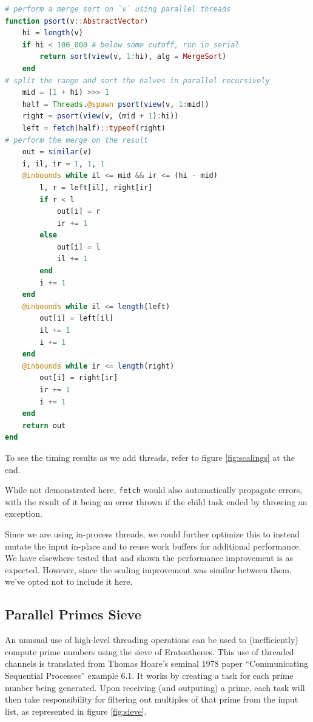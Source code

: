 \documentclass{juliacon}
\begin{document}
\begin{lstlisting}[language = Julia]
# perform a merge sort on `v` using parallel threads
function psort(v::AbstractVector)
    hi = length(v)
    if hi < 100_000 # below some cutoff, run in serial
        return sort(view(v, 1:hi), alg = MergeSort)
    end
# split the range and sort the halves in parallel recursively
    mid = (1 + hi) >>> 1
    half = Threads.@spawn psort(view(v, 1:mid))
    right = psort(view(v, (mid + 1):hi))
    left = fetch(half)::typeof(right)
# perform the merge on the result
    out = similar(v)
    i, il, ir = 1, 1, 1
    @inbounds while il <= mid && ir <= (hi - mid)
        l, r = left[il], right[ir]
        if r < l
            out[i] = r
            ir += 1
        else
            out[i] = l
            il += 1
        end
        i += 1
    end
    @inbounds while il <= length(left)
        out[i] = left[il]
        il += 1
        i += 1
    end
    @inbounds while ir <= length(right)
        out[i] = right[ir]
        ir += 1
        i += 1
    end
    return out
end
\end{lstlisting}

To see the timing results as we add threads, refer to figure \ref{fig:scalings} at the end.

While not demonstrated here, \verb|fetch| would also automatically propagate errors, with the result of it being an error thrown if the child task ended by throwing an exception.

Since we are using in-process threads, we could further optimize this to instead mutate the input in-place and to reuse work buffers for additional performance. We have elsewhere tested that and shown the performance improvement is as expected. However, since the scaling improvement was similar between them, we've opted not to include it here.

\subsection{Parallel Primes Sieve}
\label{subsub:pprimes}

An unusual use of high-level threading operations can be used to (inefficiently) compute prime numbers using the sieve of Eratosthenes.
This use of threaded channels is translated from Thomas Hoare's seminal 1978 paper ``Communicating Sequential Processes''\cite{Hoare:1978:CSP:359576.359585} example 6.1. It works by creating a task for each prime number being generated. Upon receiving (and outputing) a prime, each task will then take responsibility for filtering out multiples of that prime from the input list, as represented in figure \ref{fig:sieve}.
\end{document}
